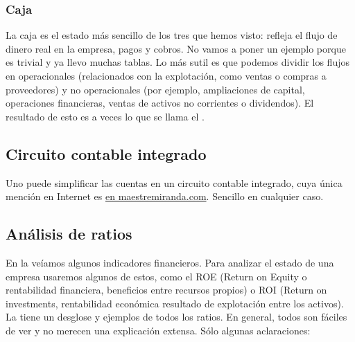 \documentclass[nochap,palatino,notitlepage]{apuntes}
\begin{document}
\subsubsection{Caja}

La caja es el estado más sencillo de los tres que hemos visto: refleja el flujo de dinero real en la empresa, pagos y cobros. No vamos a poner un ejemplo porque es trivial y ya llevo muchas tablas. Lo más sutil es que podemos dividir los flujos en operacionales (relacionados con la explotación, como ventas o compras a proveedores) y no operacionales (por ejemplo, ampliaciones de capital, operaciones financieras, ventas de activos no corrientes o dividendos). El resultado de esto es a veces lo que se llama el .

\subsection{Circuito contable integrado}

Uno puede simplificar las cuentas en un circuito contable integrado, cuya única mención en Internet es \href{http://maestremiranda.com/techdir/wp-content/uploads/2015/10/CircuitoContable.pdf}{en maestremiranda.com}. Sencillo en cualquier caso.

\subsection{Análisis de ratios}

En la  veíamos algunos indicadores financieros. Para analizar el estado de una empresa usaremos algunos de estos, como el ROE (Return on Equity o rentabilidad financiera, beneficios entre recursos propios) o ROI (Return on investments, rentabilidad económica resultado de explotación entre los activos). La  tiene un desglose y ejemplos de todos los ratios. En general, todos son fáciles de ver y no merecen una explicación extensa. Sólo algunas aclaraciones:
\end{document}
